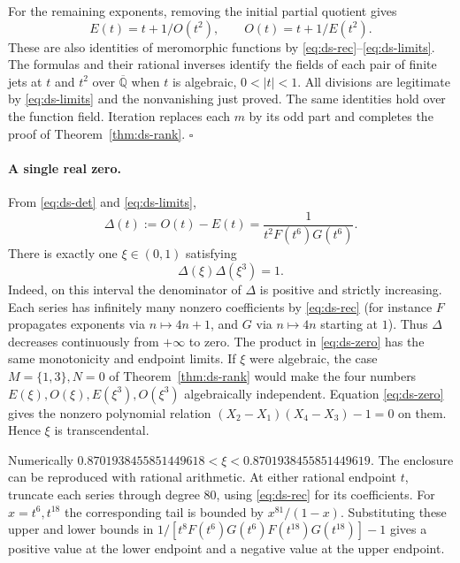\documentclass[11pt,a4paper]{article}
\theoremstyle{definition}
\theoremstyle{remark}
\numberwithin{equation}{section}
\begin{document}
For the remaining exponents, removing the initial partial quotient gives
\[
 E(t)=t+1/O(t^2),\qquad O(t)=t+1/E(t^2).
\]
These are also identities of meromorphic functions by \eqref{eq:ds-rec}--\eqref{eq:ds-limits}. The formulas and their rational inverses identify the fields of each pair of finite jets at \(t\) and \(t^2\) over \(\overline{\mathbb Q}\) when \(t\) is algebraic, \(0<|t|<1\). All divisions are legitimate by \eqref{eq:ds-limits} and the nonvanishing just proved. The same identities hold over the function field. Iteration replaces each \(m\) by its odd part and completes the proof of Theorem~\ref{thm:ds-rank}. \hfill\(\square\)

\paragraph{A single real zero.}
From \eqref{eq:ds-det} and \eqref{eq:ds-limits},
\[
 \Delta(t):=O(t)-E(t)=\frac{1}{t^2 F(t^6)G(t^6)}.
\]
There is exactly one \(\xi\in(0,1)\) satisfying
\begin{equation}
 \Delta(\xi)\Delta(\xi^3)=1.\label{eq:ds-zero}
\end{equation}
Indeed, on this interval the denominator of \(\Delta\) is positive and strictly increasing. Each series has infinitely many nonzero coefficients by \eqref{eq:ds-rec} (for instance \(F\) propagates exponents via \(n\mapsto4n+1\), and \(G\) via \(n\mapsto4n\) starting at \(1\)). Thus \(\Delta\) decreases continuously from \(+\infty\) to zero. The product in \eqref{eq:ds-zero} has the same monotonicity and endpoint limits. If \(\xi\) were algebraic, the case \(M=\{1,3\},N=0\) of Theorem~\ref{thm:ds-rank} would make the four numbers \(E(\xi),O(\xi),E(\xi^3),O(\xi^3)\) algebraically independent. Equation \eqref{eq:ds-zero} gives the nonzero polynomial relation \((X_2-X_1)(X_4-X_3)-1=0\) on them. Hence \(\xi\) is transcendental.

Numerically \(0.8701938455851449618<\xi<0.8701938455851449619\).
The enclosure can be reproduced with rational arithmetic. At either rational endpoint \(t\), truncate each series through degree \(80\), using \eqref{eq:ds-rec} for its coefficients. For \(x=t^6,t^{18}\) the corresponding tail is bounded by \(x^{81}/(1-x)\). Substituting these upper and lower bounds in \(1/[t^8 F(t^6)G(t^6)F(t^{18})G(t^{18})]-1\) gives a positive value at the lower endpoint and a negative value at the upper endpoint.
\end{document}
